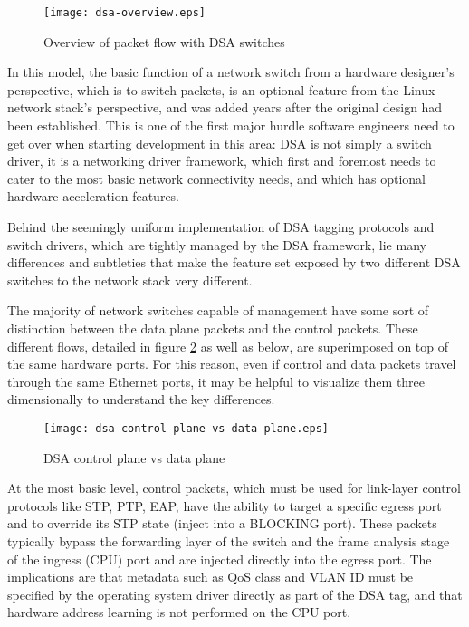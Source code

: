 \documentclass[letterpaper]{article}
\begin{document}
\begin{figure}[ht]
  \centering
  \texttt{[image: dsa-overview.eps]}
  \caption{Overview of packet flow with DSA switches}
  \label{dsa-overview}
\end{figure}

In this model, the basic function of a network switch from a hardware
designer's perspective, which is to switch packets, is an optional feature from
the Linux network stack's perspective, and was added years after the original
design had been established. This is one of the first major hurdle software
engineers need to get over when starting development in this area: DSA is not
simply a switch driver, it is a networking driver framework, which first and
foremost needs to cater to the most basic network connectivity needs, and which
has optional hardware acceleration features.

Behind the seemingly uniform implementation of DSA tagging protocols and switch
drivers, which are tightly managed by the DSA framework, lie many differences
and subtleties that make the feature set exposed by two different DSA switches
to the network stack very different.

The majority of network switches capable of management have some sort of
distinction between the data plane packets and the control packets. These
different flows, detailed in figure \ref{dsa-control-plane-vs-data-plane} as
well as below, are superimposed on top of the same hardware ports. For this
reason, even if control and data packets travel through the same Ethernet
ports, it may be helpful to visualize them three dimensionally to understand
the key differences.

\begin{figure}[ht]
  \centering
  \texttt{[image: dsa-control-plane-vs-data-plane.eps]}
  \caption{DSA control plane vs data plane}
  \label{dsa-control-plane-vs-data-plane}
\end{figure}

At the most basic level, control packets, which must be used for link-layer
control protocols like STP, PTP, EAP, have the ability to target a specific
egress port and to override its STP state (inject into a BLOCKING port). These
packets typically bypass the forwarding layer of the switch and the frame
analysis stage of the ingress (CPU) port and are injected directly into the
egress port. The implications are that metadata such as QoS class and VLAN ID
must be specified by the operating system driver directly as part of the DSA
tag, and that hardware address learning is not performed on the CPU port.
\end{document}

